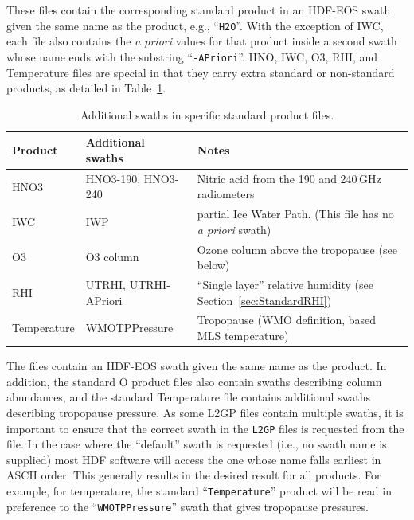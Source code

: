\documentclass[11pt,draft]{report}
\begin{document}
These files contain the corresponding standard product in an HDF-EOS
swath given the same name as the product, e.g., ``\texttt{H2O}''.  With the
exception of IWC, each file also contains the \emph{a priori} values for that
product inside a second swath whose name ends with the substring
``\texttt{-APriori}''. HNO, IWC, O3, RHI, and Temperature files are special in
that they carry extra standard or non-standard products, as detailed in
Table~\ref{tab:SwathExtras}.

\begin{table}
  \caption{Additional swaths in specific standard product
    files.\label{tab:SwathExtras}}\small
\begin{center}
\begin{tabular}{>{\ttfamily}l>{\ttfamily}ll}
  \toprule
  \textbf{\rmfamily Product} & \textbf{\rmfamily Additional swaths} &
  \textbf{\rmfamily Notes} \\
  \midrule
  HNO3 & HNO3-190, HNO3-240 & Nitric acid from the 190 and
  240\,GHz radiometers\\
  IWC & IWP & partial Ice Water Path.  (This file has no \emph{a priori} swath) \\
  O3 & O3 column & Ozone column above the tropopause (see below) \\
  RHI & UTRHI, UTRHI-APriori & ``Single layer'' relative humidity (see Section~\ref{sec:StandardRHI})\\
  Temperature & WMOTPPressure & Tropopause (WMO definition, based MLS
  temperature) \\
  \bottomrule
\end{tabular}
\end{center}
\end{table}

The files contain an HDF-EOS swath given the same name as the product.
In addition, the standard O product files also contain swaths
describing column abundances, and the standard Temperature file contains
additional swaths describing tropopause pressure.  As some L2GP files
contain multiple swaths, it is important to ensure that the correct
swath in the \texttt{L2GP} files is requested from the file.  In the
case where the ``default'' swath is requested (i.e., no swath name is
supplied) most HDF software will access the one whose name falls
earliest in ASCII order.  This generally results in the desired result
for all products.  For example, for temperature, the standard
``\texttt{Temperature}'' product will be read in preference to the
``\texttt{WMOTPPressure}'' swath that gives tropopause pressures.
\end{document}
